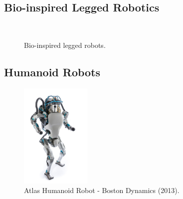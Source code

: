 \subsection{Bio-inspired Legged Robotics}

\begin{figure}
\centering
{}
~
\caption{Bio-inspired legged robots.}
\label{bioinspired-legged-robots}
\end{figure}

\subsection{Humanoid Robots}

\begin{figure}
\centering
\includegraphics[width=0.3\textwidth]{images/literature/atlas-humanoid.jpg} 
\caption{Atlas Humanoid Robot - Boston Dynamics (2013).}
\label{fig:Atlas Humanoid Robot}
\end{figure}

